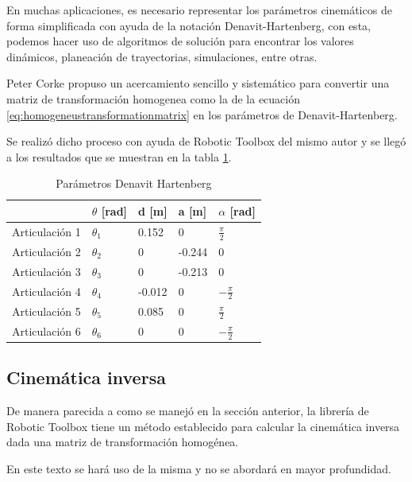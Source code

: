 En muchas aplicaciones, es necesario representar los parámetros cinemáticos de forma simplificada con ayuda de la notación Denavit-Hartenberg, con esta, podemos hacer uso de algoritmos de solución para encontrar los valores dinámicos, planeación de trayectorias, simulaciones, entre otras.

Peter Corke \cite{Corke2007} propuso un acercamiento sencillo y sistemático para convertir una matriz de transformación homogenea como la de la ecuación \ref{eq:homogeneustransformationmatrix} en los parámetros de Denavit-Hartenberg. 

Se realizó dicho proceso con ayuda de Robotic Toolbox del mismo autor y se llegó a los resultados que se muestran en la tabla \ref{table:denavithartenberg}.

\begin{table}[h]
\centering
\caption{Parámetros Denavit Hartenberg}
 \label{table:denavithartenberg}
\begin{tabular}{l|l|l|l|l|}
               & $\theta$ [rad] & d [m]    & a [m]   & $\alpha$ [rad]                        \\ 
\hline
Articulación 1 & $\theta_1$              & 0.152    & 0       & $\frac{\pi}{2}$   \\
Articulación 2 & $\theta_2$              & 0        & -0.244       & 0 \\
Articulación 3 & $\theta_3$                  & 0 & -0.213       & 0                                                  \\
Articulación 4 & $\theta_4$              & -0.012        & 0 & $-\frac{\pi}{2}$   \\
Articulación 5 & $\theta_5$                        & 0.085        & 0 & $\frac{\pi}{2}$  \\
Articulación 6 & $\theta_6$                           & 0        & 0  & $-\frac{\pi}{2}$                                                 
\end{tabular}
\end{table}

\subsection{Cinemática inversa}

De manera parecida a como se manejó en la sección anterior, la librería de Robotic Toolbox tiene un método establecido para calcular la cinemática inversa dada una matriz de transformación homogénea.

En este texto se hará uso de la misma y no se abordará en mayor profundidad. 

